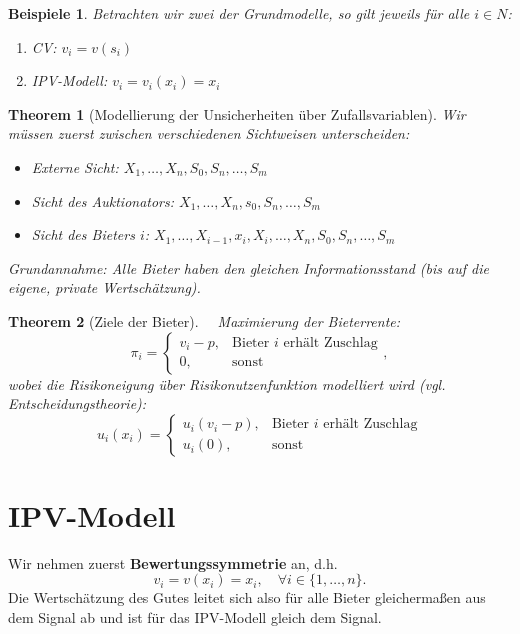 \documentclass[12pt]{extreport} %
\theoremstyle{named}
\newtheorem{unnamedtheorem}{Theorem} \counterwithin{unnamedtheorem}{chapter}
\theoremstyle{itshape}
\theoremstyle{normal}
\newtheorem*{beispiele}{Beispiele}
\begin{document}
\begin{beispiele}
	Betrachten wir zwei der Grundmodelle, so gilt jeweils für alle $i \in N$:
	\begin{enumerate}
		\item CV: $v_{i} = v(s_{i})$
		\item IPV-Modell: $v_{i} = v_{i}(x_{i}) = x_{i}$
	\end{enumerate}	
\end{beispiele}

\begin{unnamedtheorem}[Modellierung der Unsicherheiten über Zufallsvariablen]
	Wir müssen zuerst zwischen verschiedenen Sichtweisen unterscheiden:
	\begin{itemize}
		\item Externe Sicht: $X_{1}, \dotsc, X_{n}, S_{0}, S_{n}, \dotsc, S_{m}$
		\item Sicht des Auktionators: $X_{1}, \dotsc, X_{n}, s_{0}, S_{n}, \dotsc, S_{m}$
		\item Sicht des Bieters $i$:  $X_{1}, \dotsc, X_{i-1}, x_{i}, X_{i}, \dotsc, X_{n}, S_{0}, S_{n}, \dotsc, S_{m}$
	\end{itemize}
	Grundannahme: Alle Bieter haben den gleichen Informationsstand (bis auf die eigene, private Wertschätzung).
\end{unnamedtheorem}

\newpage

\begin{unnamedtheorem}[Ziele der Bieter] ~\
		Maximierung der Bieterrente:
		$$ \pi_{i} = \begin{cases} v_{i} - p, & \text{Bieter $i$ erhält Zuschlag} \\ 0, & \text{sonst} \end{cases},$$
		wobei die  Risikoneigung über Risikonutzenfunktion modelliert wird (vgl. Entscheidungstheorie):
		$$ u_{i}(x_{i}) = \begin{cases} u_{i}(v_{i}-p), & \text{Bieter $i$ erhält Zuschlag} \\ u_{i}(0), & \text{sonst} \end{cases} $$ 
\end{unnamedtheorem}


\chapter{IPV-Modell}

	Wir nehmen zuerst \textbf{Bewertungssymmetrie} an, d.h.
	$$ v_{i} = v(x_{i}) = x_{i}, \quad \forall i \in \{1, \dotsc, n\}. $$
	Die Wertschätzung des Gutes leitet sich also für alle Bieter gleichermaßen aus dem Signal ab und ist für das IPV-Modell gleich dem Signal. \\
	
\end{document}
